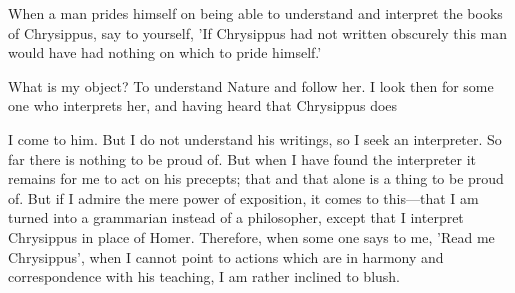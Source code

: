 When a man prides  himself on being able to understand  and interpret the books
of Chrysippus, say  to yourself, 'If Chrysippus had not  written obscurely this
man would have had nothing on which to pride himself.'

What is my  object? To understand Nature  and follow her. I look  then for some
one who interprets her, and having heard that Chrysippus does

I come to him. But I do not  understand his writings, so I seek an interpreter.
So far there is  nothing to be proud of. But when I  have found the interpreter
it remains for me to act on his precepts;  that and that alone is a thing to be
proud of. But if I admire the mere power of exposition, it comes to this—that
I am turned into a grammarian instead of a philosopher, except that I interpret
Chrysippus in  place of Homer.  Therefore, when some one  says to me,  'Read me
Chrysippus',  when  I  cannot  point  to  actions  which  are  in  harmony  and
correspondence with his teaching, I am rather inclined to blush.
